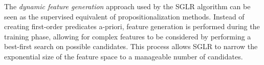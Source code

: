 \documentclass[twoside,11pt]{article}
\theoremstyle{definition}
\begin{document}


The \emph{dynamic feature generation} approach used by the SGLR algorithm \cite{popescul200716} can be seen as the supervised equivalent of propositionalization methods. Instead of creating first-order predicates a-priori, feature generation is performed during the training phase, allowing for complex features to be considered by performing a best-first search on possible candidates.
This process allows SGLR to narrow the exponential size of the feature space to a manageable number of candidates.
\end{document}
